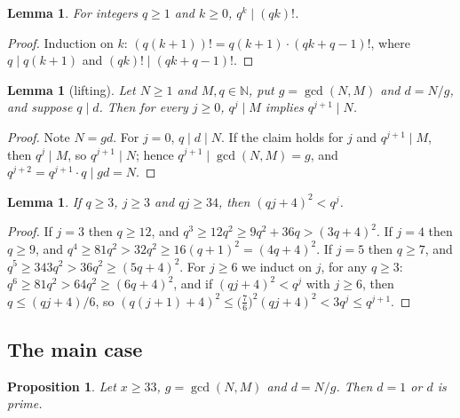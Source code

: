 \documentclass[11pt]{amsart}
\theoremstyle{plain}
\newtheorem{lemma}[theorem]{Lemma}
\newtheorem{proposition}[theorem]{Proposition}
\theoremstyle{definition}
\newcommand{\N}{\mathbb{N}}
\begin{document}
\begin{lemma}\label{lem:fact}
For integers $q\ge1$ and $k\ge0$, $q^k\mid(qk)!$.
\end{lemma}

\begin{proof}
Induction on $k$: $(q(k+1))!=q(k+1)\cdot(qk+q-1)!$, where $q\mid q(k+1)$ and $(qk)!\mid(qk+q-1)!$.
\end{proof}

\begin{lemma}[lifting]\label{lem:lift}
Let $N\ge1$ and $M,q\in\N$, put $g=\gcd(N,M)$ and $d=N/g$, and suppose $q\mid d$. Then for every $j\ge0$, $q^j\mid M$ implies $q^{j+1}\mid N$.
\end{lemma}

\begin{proof}
Note $N=gd$. For $j=0$, $q\mid d\mid N$. If the claim holds for $j$ and $q^{j+1}\mid M$, then $q^j\mid M$, so $q^{j+1}\mid N$; hence $q^{j+1}\mid\gcd(N,M)=g$, and $q^{j+2}=q^{j+1}\cdot q\mid gd=N$.
\end{proof}

\begin{lemma}\label{lem:bound}
If $q\ge3$, $j\ge3$ and $qj\ge34$, then $(qj+4)^2<q^j$.
\end{lemma}

\begin{proof}
If $j=3$ then $q\ge12$, and $q^3\ge12q^2\ge9q^2+36q>(3q+4)^2$.
If $j=4$ then $q\ge9$, and $q^4\ge81q^2>32q^2\ge16(q+1)^2=(4q+4)^2$.
If $j=5$ then $q\ge7$, and $q^5\ge343q^2>36q^2\ge(5q+4)^2$.
For $j\ge6$ we induct on $j$, for any $q\ge3$: $q^6\ge81q^2>64q^2\ge(6q+4)^2$, and if $(qj+4)^2<q^j$ with $j\ge6$, then $q\le(qj+4)/6$, so $(q(j+1)+4)^2\le\bigl(\tfrac76\bigr)^2(qj+4)^2<3q^j\le q^{j+1}$.
\end{proof}

\subsection{The main case}\label{sec:main}

\begin{proposition}\label{prop:main}
Let $x\ge33$, $g=\gcd(N,M)$ and $d=N/g$. Then $d=1$ or $d$ is prime.
\end{proposition}
\end{document}
